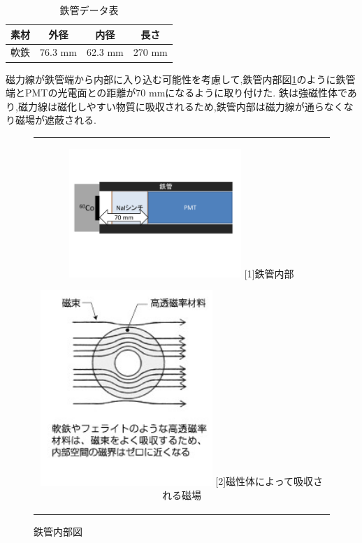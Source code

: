 \begin{table}[h]
	\centering
	 \begin{tabular}{cccc} \hline
		素材 & 外径 & 内径 & 長さ \\ \hline \hline
		軟鉄 & 76.3 mm & 62.3 mm & 270 mm \\ \hline
	\end{tabular}
	  \caption{鉄管データ表}
	  \label{ironpipedata}
\end{table}

磁力線が鉄管端から内部に入り込む可能性を考慮して,鉄管内部図\ref{ironinnerfigure}のように鉄管端とPMTの光電面との距離が70 mmになるように取り付けた.
鉄は強磁性体であり,磁力線は磁化しやすい物質に吸収されるため,鉄管内部は磁力線が通らなくなり磁場が遮蔽される.

\begin{figure}[tbp]
  \begin{center}
    \begin{tabular}{c}
      \begin{minipage}[H]{0.6\hsize}    
        \begin{center}
          \includegraphics[width=6.5cm]{fig/iguchi/PMTinFe.pdf}
	\hspace{3cm}[1]鉄管内部
     \end{center}
    \end{minipage}
      \begin{minipage}[h]{0.4\hsize}    
        \begin{center}
          \includegraphics[width=6.5cm]{fig/iguchi/jibakyusyu.jpg}
         \hspace{3cm}[2]磁性体によって吸収される磁場
         \end{center}
        \end{minipage}
     
     \end{tabular}
     \label{ironinnerfigure}
      \caption{鉄管内部図}
      \end{center}
   \end{figure}
   
